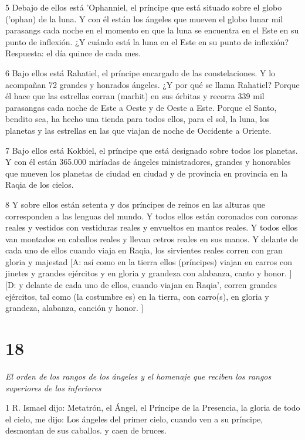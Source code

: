 \par 5 Debajo de ellos está 'Ophanniel, el príncipe que está situado sobre el globo ('ophan) de la luna. Y con él están los ángeles que mueven el globo lunar mil parasangs cada noche en el momento en que la luna se encuentra en el Este en su punto de inflexión. ¿Y cuándo está la luna en el Este en su punto de inflexión? Respuesta: el día quince de cada mes.

\par 6 Bajo ellos está Rahatiel, el príncipe encargado de las constelaciones. Y lo acompañan 72 grandes y honrados ángeles. ¿Y por qué se llama Rahatiel? Porque él hace que las estrellas corran (marhit) en sus órbitas y recorra 339 mil parasangas cada noche de Este a Oeste y de Oeste a Este. Porque el Santo, bendito sea, ha hecho una tienda para todos ellos, para el sol, la luna, los planetas y las estrellas en las que viajan de noche de Occidente a Oriente.

\par 7 Bajo ellos está Kokbiel, el príncipe que está designado sobre todos los planetas. Y con él están 365.000 miríadas de ángeles ministradores, grandes y honorables que mueven los planetas de ciudad en ciudad y de provincia en provincia en la Raqia de los cielos.

\par 8 Y sobre ellos están setenta y dos príncipes de reinos en las alturas que corresponden a las lenguas del mundo. Y todos ellos están coronados con coronas reales y vestidos con vestiduras reales y envueltos en mantos reales. Y todos ellos van montados en caballos reales y llevan cetros reales en sus manos. Y delante de cada uno de ellos cuando viaja en Raqia, los sirvientes reales corren con gran gloria y majestad [A: así como en la tierra ellos (príncipes) viajan en carros con jinetes y grandes ejércitos y en gloria y grandeza con alabanza, canto y honor. ] [D: y delante de cada uno de ellos, cuando viajan en Raqia', corren grandes ejércitos, tal como (la costumbre es) en la tierra, con carro(s), en gloria y grandeza, alabanza, canción y honor. ]


\chapter{18}

\par \textit{El orden de los rangos de los ángeles y el homenaje que reciben los rangos superiores de los inferiores}

\par 1 R. Ismael dijo: Metatrón, el Ángel, el Príncipe de la Presencia, la gloria de todo el cielo, me dijo: Los ángeles del primer cielo, cuando ven a su príncipe, desmontan de sus caballos. y caen de bruces.

